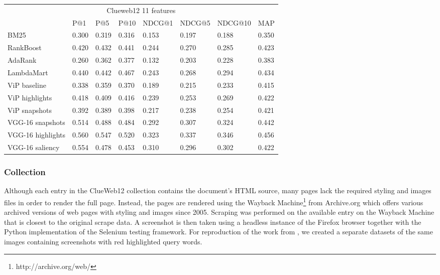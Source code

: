 \begin{table}[t]
\begin{center}
\begin{tabular}{llllllll}
\multicolumn{8}{c}{Clueweb12 11 features}                                    \\ 
                      & P@1   & P@5   & P@10  & NDCG@1 & NDCG@5 & NDCG@10 & MAP   \\ \hline
BM25                  & 0.300 & 0.319 & 0.316 & 0.153  & 0.197  & 0.188   & 0.350 \\ \hline
RankBoost             & 0.420 & 0.432 & 0.441 & 0.244  & 0.270  & 0.285   & 0.423 \\
AdaRank               & 0.260 & 0.362 & 0.377 & 0.132  & 0.203  & 0.228   & 0.383 \\
LambdaMart            & 0.440 & 0.442 & 0.467 & 0.243  & 0.268  & 0.294   & 0.434 \\ \hline
ViP baseline          & 0.338 & 0.359 & 0.370 & 0.189  & 0.215  & 0.233   & 0.415 \\ \hline
ViP highlights        & 0.418 & 0.409 & 0.416 & 0.239  & 0.253  & 0.269   & 0.422 \\
ViP snapshots         & 0.392 & 0.389 & 0.398 & 0.217  & 0.238  & 0.254   & 0.421 \\ \hline
VGG-16 snapshots      & 0.514 & 0.488 & 0.484 & 0.292  & 0.307  & 0.324   & 0.442 \\ 
VGG-16 highlights     & 0.560 & 0.547 & 0.520 & 0.323  & 0.337  & 0.346   & 0.456 \\ \hline
VGG-16 saliency       & 0.554 & 0.478 & 0.453 & 0.310  & 0.296  & 0.302   & 0.422 \\
\end{tabular}
\centering
{}
\label{tab:results}
\end{center}
\end{table}


\subsubsection{Collection}
Although each entry in the ClueWeb12 collection contains the document's HTML source, many pages lack the required styling and images files in order to render the full page. Instead, the pages are rendered using the Wayback Machine\footnote{http://archive.org/web/} from Archive.org which offers various archived versions of web pages with styling and images since 2005. Scraping was performed on the available entry on the Wayback Machine that is closest to the original scrape data. A screenshot is then taken using a headless instance of the Firefox browser together with the Python implementation of the Selenium testing framework. 
For reproduction of the work from \citet{fan2017learning}, we created a separate datasets of the same images containing screenshots with red highlighted query words. 

